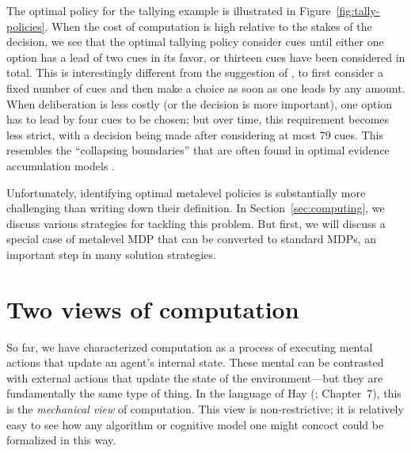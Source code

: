 The optimal policy for the tallying example is illustrated in Figure~\ref{fig:tally-policies}. When the cost of computation is high relative to the stakes of the decision, we see that the optimal tallying policy consider cues until either one option has a lead of two cues in its favor, or thirteen cues have been considered in total. This is interestingly different from the suggestion of \citet{gigerenzer2011heuristic}, to first consider a fixed number of cues and then make a choice as soon as one leads by any amount. When deliberation is less costly (or the decision is more important), one option has to lead by four cues to be chosen; but over time, this requirement becomes less strict, with a decision being made after considering at most 79 cues. This resembles the ``collapsing boundaries'' that are often found in optimal evidence accumulation models \citep{drugowitsch2012cost}.

Unfortunately, identifying optimal metalevel policies is substantially more challenging than writing down their definition. In Section~\ref{sec:computing}, we discuss various strategies for tackling this problem. But first, we will discuss a special case of metalevel MDP that can be converted to standard MDPs, an important step in many solution strategies. 


\section{Two views of computation}

So far, we have characterized computation as a process of executing mental actions that update an agent's internal state. These mental can be contrasted with external actions that update the state of the environment---but they are fundamentally the same type of thing. In the language of Hay (\citeyear{hay2016principles}; Chapter~7), this is the \emph{mechanical view} of computation. This view is non-restrictive; it is relatively easy to see how any algorithm or cognitive model one might concoct could be formalized in this way.


